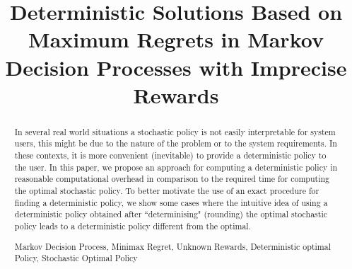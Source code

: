 \documentclass[runningheads,a4paper]{llncs}
\newcommand{\up}[1]{\textsuperscript{#1}}
\newcommand{\keywords}[1]{\par\addvspace\baselineskip
\noindent\keywordname\enspace\ignorespaces#1}
\begin{document}
\mainmatter  %

\title{Deterministic Solutions Based on Maximum Regrets in Markov Decision Processes with Imprecise Rewards}


%
%


%



%
%

\maketitle


\begin{abstract}
In several real world situations a stochastic policy is not easily interpretable for system users, this might be due to the nature of the problem or to the system requirements. In these contexts, it is more convenient (inevitable) to provide a deterministic policy to the user. In this paper, we propose an approach for computing a deterministic policy in reasonable computational overhead in comparison to the required time for computing the optimal stochastic policy. To better motivate the use of an exact procedure for finding a deterministic policy, we show some cases where the intuitive idea of using a deterministic policy obtained after ``determinising" (rounding) the optimal stochastic policy leads to a deterministic policy different from the optimal.

\keywords{Markov Decision Process, Minimax Regret, Unknown Rewards, Deterministic optimal Policy, Stochastic Optimal Policy}
\end{abstract}
\end{document}
